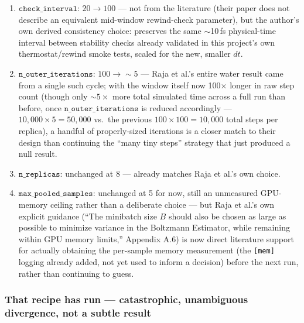 \documentclass[11pt]{article}
\begin{document}
\begin{enumerate}
  own 1\,fs timestep), but matching the underlying quantity that actually
  matters, physical simulated time (their own explicit $\sim$1\,ps choice
  and general guideline): $10{,}000\times0.1\text{ fs}=1\text{ ps}$, exactly
  matching their water-specific choice once expressed in the same units.
  \item $\texttt{check\_interval}$: $20\to100$ --- not from the literature
  (their paper does not describe an equivalent mid-window rewind-check
  parameter), but the author's own derived consistency choice: preserves the
  same $\sim$10\,fs physical-time interval between stability checks already
  validated in this project's own thermostat/rewind smoke tests, scaled for
  the new, smaller $dt$.
  \item $\texttt{n\_outer\_iterations}$: $100\to\sim5$ --- Raja et al.'s
  entire water result came from a single such cycle; with the window itself
  now 100$\times$ longer in raw step count (though only
  $\sim5\times$ more total simulated time across a full run than before,
  once $\texttt{n\_outer\_iterations}$ is reduced accordingly --- $10{,}000
  \times5=50{,}000$ vs.\ the previous $100\times100=10{,}000$ total steps per
  replica), a handful of properly-sized iterations is a closer match to
  their design than continuing the ``many tiny steps'' strategy that just
  produced a null result.
  \item $\texttt{n\_replicas}$: unchanged at 8 --- already matches Raja et
  al.'s own choice.
  \item $\texttt{max\_pooled\_samples}$: unchanged at 5 for now, still an
  unmeasured GPU-memory ceiling rather than a deliberate choice --- but Raja
  et al.'s own explicit guidance (``The minibatch size $B$ should also be
  chosen as large as possible to minimize variance in the Boltzmann
  Estimator, while remaining within GPU memory limits,'' Appendix A.6) is
  now direct literature support for actually obtaining the per-sample
  memory measurement (the \texttt{[mem]} logging already added, not yet used
  to inform a decision) before the next run, rather than continuing to
  guess.
\end{enumerate}

\subsubsection{That recipe has run --- catastrophic, unambiguous divergence, not a subtle result}
\label{sec:q4-stable-lr-divergence}
\end{document}
